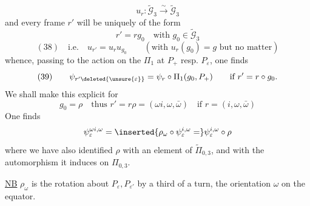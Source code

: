 \[
u_r:\widetilde{\mathcal G}_3\xrightarrow{\sim}\widetilde{\mathcal G}_3
\]
and every frame $r'$  will be uniquely of the form
\[
r'=rg_0\quad\text{with }g_0\in\widetilde{\mathcal G}_3
\]
\[
(38)\quad\text{i.e.}\quad u_{r'}=u_ru_{g_0}\qquad(\text{with }u_r(g_0)=g\text{ but no matter})
\]
whence, passing to the action on the $\Pi_1$ at $P_+$ resp. $P_\varepsilon$, one finds
\[
(39)\qquad \psi_{r'\deleted{\unsure{\varepsilon}}}=\psi_r\circ\Pi_1(g_0,P_+)\qquad\text{if }r'=r\circ g_0.
\]
We shall make this explicit for
\[
g_0=\rho\quad\text{thus }r'=r\rho=(\omega i,\omega,\bar\omega)\quad\text{if }r=(i,\omega,\bar\omega)
\]
One finds
\[
\psi_\varepsilon^{\omega i,\omega}=\inserted{\rho_\omega\circ\psi_\varepsilon^{i,\omega}=}\psi_\varepsilon^{i,\omega}\circ\rho
\]
where we have also identified $\rho$ with an element of $\widetilde\Pi_{0,3}$, and with the automorphism it induces on $\Pi_{0,3}$.

\uline{NB} $\rho_\omega$ is the rotation about $P_\varepsilon,P_{\varepsilon'}$ by a third of a turn,  the orientation $\omega$ on the equator.

